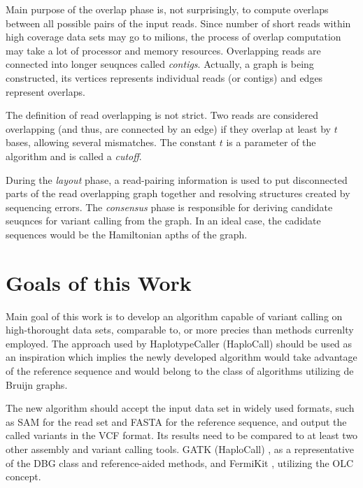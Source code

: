 Main purpose of the overlap phase is, not surprisingly, to compute overlaps between all possible pairs of the input reads. Since number of short reads within high coverage data sets may go to milions, the process of overlap computation may take a lot of processor and memory resources. Overlapping reads are connected into longer seuqnces called \textit{contigs}. Actually, a graph is being constructed, its vertices represents individual reads (or contigs) and edges represent overlaps.

The definition of read overlapping is not strict. Two reads are considered overlapping (and thus, are connected by an edge) if they overlap at least by $t$ bases, allowing several mismatches. The constant $t$ is a parameter of the algorithm and is called a \textit{cutoff}.

During the \textit{layout} phase, a read-pairing information is used to put disconnected parts of the read overlapping graph together and resolving structures created by sequencing errors. The \textit{consensus} phase is responsible for deriving candidate seuqnces for variant calling from the graph. In an ideal case, the cadidate sequences would be the Hamiltonian apths of the graph.

\section{Goals of this Work}
\label{sec:goals-of-this-work}

Main goal of this work is to develop an algorithm capable of variant calling on high-thorought data sets, comparable to, or more precies than methods currenlty employed. The approach used by HaplotypeCaller (HaploCall) should be used as an inspiration which implies the newly developed algorithm would take advantage of the reference sequence and would belong to the class of algorithms utilizing de Bruijn graphs.

The new algorithm should accept the input data set in widely used formats, such as SAM for the read set and FASTA for the reference sequence, and output the called variants in the VCF format\cite{vcf-format}. Its results need to be compared to at least two other assembly and variant calling tools. GATK (HaploCall) \cite{haplocall}, as a representative of the DBG class and reference-aided methods, and FermiKit \cite{fermikit}, utilizing the OLC concept.